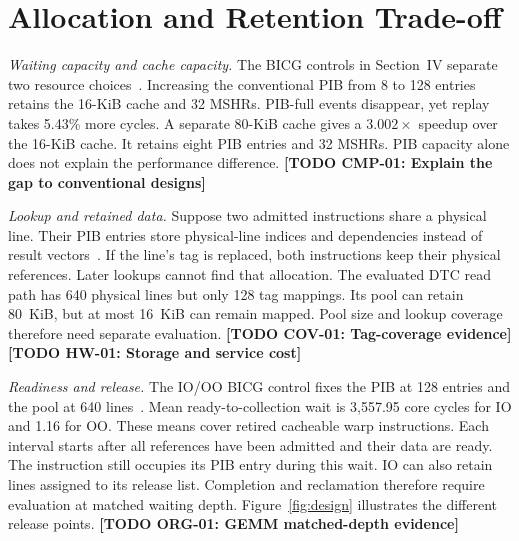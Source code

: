 \providecommand{\dtctodo}[2]{\textbf{[TODO #1: #2]}}
\section{Allocation and Retention Trade-off}
\label{sec:motivation}

\textit{Waiting capacity and cache capacity.}
The BICG controls in Section~IV separate two resource choices~\cite{dtc-artifact}.
Increasing the conventional PIB from 8 to 128 entries retains the 16-KiB cache and 32 MSHRs.
PIB-full events disappear, yet replay takes 5.43\% more cycles.
A separate 80-KiB cache gives a $3.002\times$ speedup over the 16-KiB cache.
It retains eight PIB entries and 32 MSHRs.
PIB capacity alone does not explain the performance difference.
\dtctodo{CMP-01}{Explain the gap to conventional designs}

\textit{Lookup and retained data.}
Suppose two admitted instructions share a physical line.
Their PIB entries store physical-line indices and dependencies instead of result vectors~\cite{zhao2024}.
If the line's tag is replaced, both instructions keep their physical references.
Later lookups cannot find that allocation.
The evaluated DTC read path has 640 physical lines but only 128 tag mappings.
Its pool can retain 80~KiB, but at most 16~KiB can remain mapped.
Pool size and lookup coverage therefore need separate evaluation.
\dtctodo{COV-01}{Tag-coverage evidence}
\dtctodo{HW-01}{Storage and service cost}

\textit{Readiness and release.}
The IO/OO BICG control fixes the PIB at 128 entries and the pool at 640 lines~\cite{dtc-artifact}.
Mean ready-to-collection wait is 3,557.95 core cycles for IO and 1.16 for OO.
These means cover retired cacheable warp instructions.
Each interval starts after all references have been admitted and their data are ready.
The instruction still occupies its PIB entry during this wait.
IO can also retain lines assigned to its release list.
Completion and reclamation therefore require evaluation at matched waiting depth.
Figure~\ref{fig:design} illustrates the different release points.
\dtctodo{ORG-01}{GEMM matched-depth evidence}
